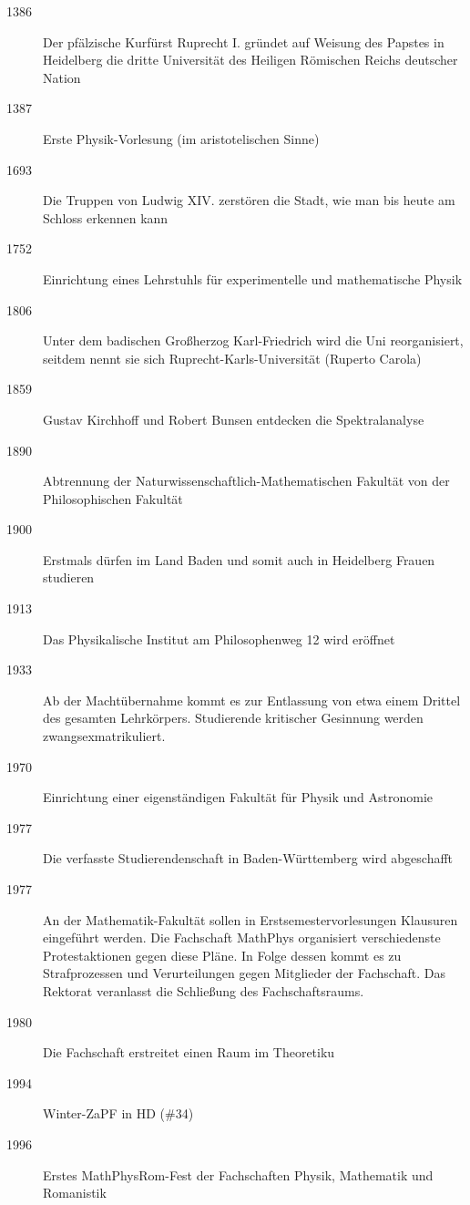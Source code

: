 \begin{description}
\item[1386] Der pfälzische Kurfürst Ruprecht I. gründet auf Weisung des Papstes in Heidelberg die dritte Universität des Heiligen Römischen Reichs deutscher Nation
\item[1387]  Erste Physik-Vorlesung (im aristotelischen Sinne)
\item[1693]Die Truppen von Ludwig XIV. zerstören die Stadt, wie man bis heute am Schloss erkennen kann
\item[1752] Einrichtung eines Lehrstuhls für experimentelle und mathematische Physik
\item[1806] Unter dem badischen Großherzog Karl-Friedrich wird die Uni reorganisiert, seitdem nennt sie sich Ruprecht-Karls-Universität (Ruperto Carola)


\item[1859] Gustav Kirchhoff und Robert Bunsen entdecken die Spektralanalyse
\item[1890] Abtrennung der Naturwissenschaftlich-Mathematischen Fakultät von der Philosophischen Fakultät
\item[1900] Erstmals dürfen im Land Baden und somit auch in Heidelberg Frauen studieren
\item[1913] Das Physikalische Institut am Philosophenweg 12 wird eröffnet
\item[1933] Ab der Machtübernahme kommt es zur Entlassung von etwa einem Drittel des gesamten Lehrkörpers. Studierende kritischer Gesinnung werden zwangsexmatrikuliert. 


\item[1970] Einrichtung einer eigenständigen Fakultät für Physik und Astronomie
\item[1977] Die verfasste Studierendenschaft in Baden-Württemberg wird abgeschafft
\item[1977] An der Mathematik-Fakultät sollen in Erstsemestervorlesungen Klausuren eingeführt werden.
Die Fachschaft MathPhys organisiert verschiedenste Protestaktionen gegen diese Pläne. In Folge dessen kommt es zu Strafprozessen und Verurteilungen gegen Mitglieder der Fachschaft. Das Rektorat veranlasst die Schließung des Fachschaftsraums.
\item[1980] Die Fachschaft erstreitet einen Raum im Theoretiku
\item[1994] Winter-ZaPF in HD (\#34)
\item[1996] Erstes MathPhysRom-Fest der Fachschaften Physik, Mathematik und Romanistik


\end{description}
